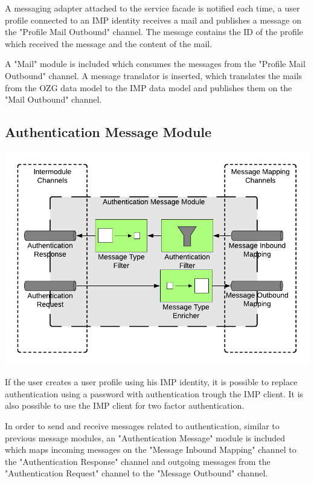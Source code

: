 A messaging adapter attached to the service facade is notified each time, a user profile connected to an IMP identity receives a mail and publishes a message on the "Profile Mail Outbound" channel. The message contains the ID of the profile which received the message and the content of the mail.

A "Mail" module is included which consumes the messages from the "Profile Mail Outbound" channel. A message translator is inserted, which translates the mails from the OZG data model to the IMP data model and publishes them on the "Mail Outbound" channel.

\subsection{Authentication Message Module}

\begin{center}
    \includegraphics[scale=0.6]{Diagrams/Integration Architecture 1/Technological Integration/16. Authenticatin Message Module.pdf}
\end{center}

If the user creates a user profile using his IMP identity, it is possible to replace authentication using a password with authentication trough the IMP client. It is also possible to use the IMP client for two factor authentication.

In order to send and receive messages related to authentication, similar to previous message modules, an "Authentication Message" module is included which maps incoming messages on the "Message Inbound Mapping" channel to the "Authentication Response" channel and outgoing messages from the "Authentication Request" channel to the "Message Outbound" channel.

